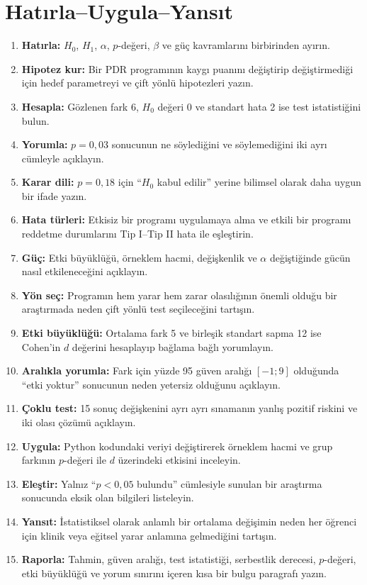 




\section*{Hatırla--Uygula--Yansıt}

\begin{enumerate}
\renewcommand{\labelenumi}{\textbf{\Alph{enumi}.}}
  \item \textbf{Hatırla:} $H_0$, $H_1$, $\alpha$, $p$-değeri, $\beta$ ve güç kavramlarını birbirinden ayırın.
  \item \textbf{Hipotez kur:} Bir PDR programının kaygı puanını değiştirip değiştirmediği için hedef parametreyi ve çift yönlü hipotezleri yazın.
  \item \textbf{Hesapla:} Gözlenen fark 6, $H_0$ değeri 0 ve standart hata 2 ise test istatistiğini bulun.
  \item \textbf{Yorumla:} $p=0{,}03$ sonucunun ne söylediğini ve söylemediğini iki ayrı cümleyle açıklayın.
  \item \textbf{Karar dili:} $p=0{,}18$ için ``$H_0$ kabul edilir'' yerine bilimsel olarak daha uygun bir ifade yazın.
  \item \textbf{Hata türleri:} Etkisiz bir programı uygulamaya alma ve etkili bir programı reddetme durumlarını Tip I--Tip II hata ile eşleştirin.
  \item \textbf{Güç:} Etki büyüklüğü, örneklem hacmi, değişkenlik ve $\alpha$ değiştiğinde gücün nasıl etkileneceğini açıklayın.
  \item \textbf{Yön seç:} Programın hem yarar hem zarar olasılığının önemli olduğu bir araştırmada neden çift yönlü test seçileceğini tartışın.
  \item \textbf{Etki büyüklüğü:} Ortalama fark 5 ve birleşik standart sapma 12 ise Cohen'in $d$ değerini hesaplayıp bağlama bağlı yorumlayın.
  \item \textbf{Aralıkla yorumla:} Fark için yüzde 95 güven aralığı $[-1;9]$ olduğunda ``etki yoktur'' sonucunun neden yetersiz olduğunu açıklayın.
  \item \textbf{Çoklu test:} 15 sonuç değişkenini ayrı ayrı sınamanın yanlış pozitif riskini ve iki olası çözümü açıklayın.
  \item \textbf{Uygula:} Python kodundaki veriyi değiştirerek örneklem hacmi ve grup farkının $p$-değeri ile $d$ üzerindeki etkisini inceleyin.
  \item \textbf{Eleştir:} Yalnız ``$p<0{,}05$ bulundu'' cümlesiyle sunulan bir araştırma sonucunda eksik olan bilgileri listeleyin.
  \item \textbf{Yansıt:} İstatistiksel olarak anlamlı bir ortalama değişimin neden her öğrenci için klinik veya eğitsel yarar anlamına gelmediğini tartışın.
  \item \textbf{Raporla:} Tahmin, güven aralığı, test istatistiği, serbestlik derecesi, $p$-değeri, etki büyüklüğü ve yorum sınırını içeren kısa bir bulgu paragrafı yazın.
\end{enumerate}

